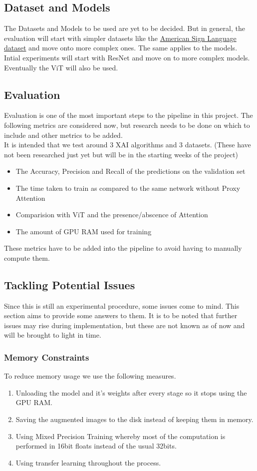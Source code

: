 \subsection{Dataset and Models}
The Datasets and Models to be used are yet to be decided. But in general, the evaluation will start with simpler datasets like the \href{https://www.kaggle.com/datasets/grassknoted/asl-alphabet}{American Sign Language dataset} and move onto more complex ones.
The same applies to the models. Intial experiments will start with ResNet \cite{he2016deep} and move on to more complex models. Eventually the ViT \cite{dosovitskiy2020image} will also be used.

\subsection{Evaluation}
Evaluation is one of the most important steps to the pipeline in this project. The following metrics are considered now, but research needs to be done on which to include and other metrics to be added. \\
It is intended that we test around 3 XAI algorithms and 3 datasets. (These have not been researched just yet but will be in the starting weeks of the project)
\begin{itemize}
    \item The Accuracy, Precision and Recall of the predictions on the validation set
    \item The time taken to train as compared to the same network without Proxy Attention
    \item Comparision with ViT \cite{dosovitskiy2020image} and the presence/abscence of Attention
    \item The amount of GPU RAM used for training
\end{itemize}
These metrics have to be added into the pipeline to avoid having to manually compute them.

\subsection{Tackling Potential Issues}
Since this is still an experimental procedure, some issues come to mind. This section aims to provide some answers to them. It is to be noted that further issues may rise during implementation, but these are not known as of now and will be brought to light in time.
\subsubsection*{Memory Constraints}
To reduce memory usage we use the following measures.
\begin{enumerate}
    \item Unloading the model and it's weights after every stage so it stops using the GPU RAM.
    \item Saving the augmented images to the disk instead of keeping them in memory.
    \item Using Mixed Precision Training whereby most of the computation is performed in 16bit floats instead of the usual 32bits.
    \item Using transfer learning throughout the process.
\end{enumerate}
